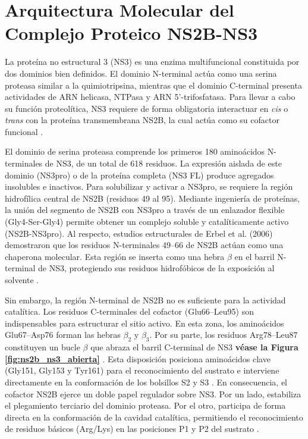 \section{Arquitectura Molecular del Complejo Proteico NS2B-NS3}
La proteína no estructural 3 (NS3) es una enzima multifuncional constituida por dos dominios bien definidos. El dominio N-terminal actúa como una serina proteasa similar a la quimiotripsina, mientras que el dominio C-terminal presenta actividades de ARN helicasa, NTPasa y ARN 5'-trifosfatasa. Para llevar a cabo su función proteolítica, NS3 requiere de forma obligatoria interactuar en \textit{cis} o \textit{trans} con la proteína transmembrana NS2B, la cual actúa como su cofactor funcional \cite{diosa2020role}.

El dominio de serina proteasa comprende los primeros 180 aminoácidos N-terminales de NS3, de un total de 618 residuos. La expresión aislada de este dominio (NS3pro) o de la proteína completa (NS3 FL) produce agregados insolubles e inactivos. Para solubilizar y activar a NS3pro, se requiere la región hidrofílica central de NS2B (residuos 49 al 95). Mediante ingeniería de proteínas, la unión del segmento de NS2B con NS3pro a través de un enlazador flexible (Gly4-Ser-Gly4) permite obtener un complejo soluble y catalíticamente activo (NS2B-NS3pro). Al respecto, estudios estructurales de Erbel et al. (2006) demostraron que los residuos N-terminales 49–66 de NS2B actúan como una chaperona molecular. Esta región se inserta como una hebra $\beta$ en el barril N-terminal de NS3, protegiendo sus residuos hidrofóbicos de la exposición al solvente \cite{lescar2008towards}.

Sin embargo, la región N-terminal de NS2B no es suficiente para la actividad catalítica. Los residuos C-terminales del cofactor (Glu66–Leu95) son indispensables para estructurar el sitio activo. En esta zona, los aminoácidos Glu67–Asp76 forman las hebras $\beta_2$ y $\beta_3$. Por su parte, los residuos Arg78–Leu87 constituyen un bucle $\beta$ que abraza el barril C-terminal de NS3 \textbf{véase la Figura \ref{fig:ns2b_ns3_abierta}} . Esta disposición posiciona aminoácidos clave (Gly151, Gly153 y Tyr161) para el reconocimiento del sustrato e interviene directamente en la conformación de los bolsillos S2 y S3 \cite{erbel2006structural}. En consecuencia, el cofactor NS2B ejerce un doble papel regulador sobre NS3. Por un lado, estabiliza el plegamiento terciario del dominio proteasa. Por el otro, participa de forma directa en la conformación de la cavidad catalítica, permitiendo el reconocimiento de residuos básicos (Arg/Lys) en las posiciones P1 y P2 del sustrato \cite{luo2015flavivirus}.

